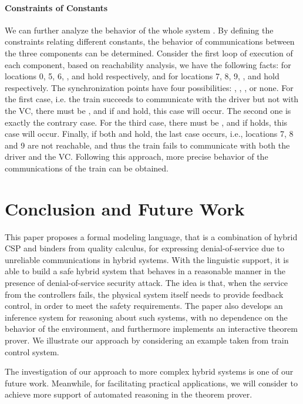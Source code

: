 \documentclass{llncs}
\begin{document}
\paragraph{\textbf{Constraints of Constants}}

We can further analyze the behavior of the whole system . By defining the constraints relating
 different constants, the behavior of communications between
the three components can be determined.
Consider the first loop of execution of each component, based on reachability analysis, we have the following facts:
for locations 0, 5, 6,  ,  and  hold respectively, and
for locations 7, 8, 9, ,  and  hold respectively.
The synchronization points have four possibilities: ,  ,  , or none. For the first case,
i.e. the train succeeds to communicate with the driver but not with the VC,
there must be , and if  and  hold, this case will occur.
The second one is exactly the contrary case.
For the third case, there must be , and if
 holds, this case will occur. Finally, if both
 and  hold, the last case occurs, i.e., locations 7, 8 and 9 are not reachable, and thus
the train fails to communicate with both the driver and the VC.
Following this approach,  more precise behavior of the communications of the train
can be obtained.


\section{Conclusion and Future Work}
\label{sec:conclusion}


This paper proposes a formal modeling  language, that is a combination of hybrid CSP and binders from quality calculus,
 for expressing denial-of-service due to unreliable communications in hybrid systems.
With the linguistic support, it is able to build a safe hybrid system that behaves in a reasonable manner
in the presence of denial-of-service security attack. 
The idea is that, when the service from the controllers  fails, the physical
system itself needs to provide feedback control, in order to meet the safety requirements.
The paper also develops an inference system for reasoning about  such systems,
with no dependence on the behavior of the environment, and furthermore  implements an interactive theorem prover.
We illustrate our approach by considering an example taken from train control system.


The investigation of our approach to more
complex hybrid systems is one of our future work. Meanwhile, for facilitating practical applications, we will consider
to achieve more support of automated reasoning in the theorem prover.




\end{document}
